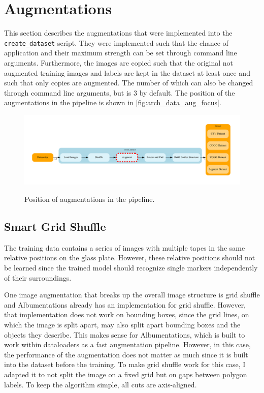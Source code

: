 \documentclass[10pt]{book}
\newcommand{\figureref}[1]{\autoref{#1}}
\begin{document}
\section{Augmentations}
\label{sec:augs}

This section describes the augmentations that were implemented into the \texttt{create\_dataset} script. They were implemented such that the chance of application and their maximum strength can be set through command line arguments. Furthermore, the images are copied such that the original not augmented training images and labels are kept in the dataset at least once and such that only copies are augmented. The number of which can also be changed through command line arguments, but is 3 by default. The position of the augmentations in the pipeline is shown in \figureref{fig:arch_data_aug_focus}.

\begin{figure}
  \caption{Position of augmentations in the pipeline.}
  \includegraphics[width=\textwidth]{graph/arch_data_aug_focus}
  \label{fig:arch_data_aug_focus}
\end{figure}

\subsection{Smart Grid Shuffle}

The training data contains a series of images with multiple tapes in the same relative positions on the glass plate. However, these relative positions should not be learned since the trained model should recognize single markers independently of their surroundings. 

One image augmentation that breaks up the overall image structure is grid shuffle and Albumentations already has an implementation for grid shuffle. However, that implementation does not work on bounding boxes, since the grid lines, on which the image is split apart, may also split apart bounding boxes and the objects they describe. This makes sense for Albumentations, which is built to work within dataloaders as a fast augmentation pipeline. However, in this case, the performance of the augmentation does not matter as much since it is built into the dataset before the training. To make grid shuffle work for this case, I adapted it to not split the image on a fixed grid but on gaps between polygon labels. To keep the algorithm simple, all cuts are axis-aligned.
\end{document}

